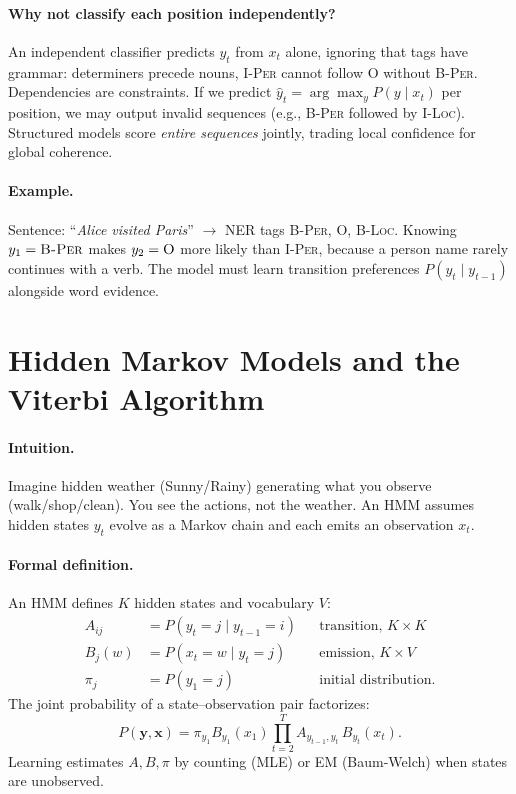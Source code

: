 \paragraph{Why not classify each position independently?} An independent classifier predicts $y_t$ from $x_t$ alone, ignoring that tags have grammar: determiners precede nouns, \textsc{I-Per} cannot follow \textsc{O} without \textsc{B-Per}. Dependencies are constraints. If we predict $\hat{y}_t=\arg\max_y P(y\mid x_t)$ per position, we may output invalid sequences (e.g., \textsc{B-Per} followed by \textsc{I-Loc}). Structured models score \emph{entire sequences} jointly, trading local confidence for global coherence.

\paragraph{Example.} Sentence: ``\emph{Alice visited Paris}'' $\to$ NER tags \textsc{B-Per}, \textsc{O}, \textsc{B-Loc}. Knowing $y_1=\textsc{B-Per}$ makes $y_2=\textsc{O}$ more likely than \textsc{I-Per}, because a person name rarely continues with a verb. The model must learn transition preferences $P(y_t\mid y_{t-1})$ alongside word evidence.

\section{Hidden Markov Models and the Viterbi Algorithm}
\label{sec:hmm}
\paragraph{Intuition.} Imagine hidden weather (Sunny/Rainy) generating what you observe (walk/shop/clean). You see the actions, not the weather. An HMM assumes hidden states $y_t$ evolve as a Markov chain and each emits an observation $x_t$.

\paragraph{Formal definition.} An HMM defines $K$ hidden states and vocabulary $V$:
\begin{align}
    A_{ij} &= P(y_t=j \mid y_{t-1}=i) &&\text{transition, } K\times K \label{eq:trans}\\
    B_{j}(w) &= P(x_t=w \mid y_t=j) &&\text{emission, } K\times V \label{eq:emit}\\
    \pi_j &= P(y_1=j) &&\text{initial distribution.} \nonumber
\end{align}
The joint probability of a state--observation pair factorizes:
\begin{equation}
P(\mathbf{y},\mathbf{x}) = \pi_{y_1} B_{y_1}(x_1)\prod_{t=2}^{T} A_{y_{t-1},y_t}\,B_{y_t}(x_t).
\label{eq:hmm-joint}
\end{equation}
Learning estimates $A,B,\pi$ by counting (MLE) or EM (Baum-Welch) when states are unobserved.

